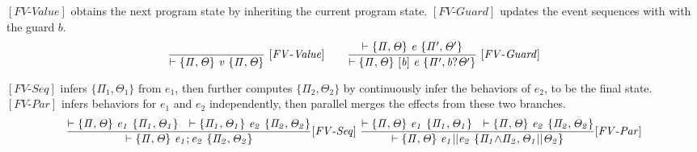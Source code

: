 \documentclass[acmsmall,10pt,review]{acmart}
\newcommand{\env}{\code{\mathcal{V}}}
\newcommand{\code}[1]{{\tt{\ensuremath{\m{#1}}}}}
\newcommand{\m}{\mathit}
\def\defeq{\ensuremath{\,\triangleq}}
\begin{document}
{

$[FV\text{-}\m{Value}]$  obtains the next program state by 
inheriting the current program state.
$[FV\text{-}Guard]$ updates the event sequences with with
the guard \code{b}. 
{{\small\begin{gather*}
  \code{\frac{
  }
{  \vdash \{  \Pi, \Theta \}\  v \ 
\{ \Pi, \Theta \}} \  
 {[FV\text{-}Value]}} 
 \qquad
 \code{\frac{
  \vdash \{  \Pi, \Theta \}\  e \ 
  \{ \Pi^\prime, \Theta^\prime \}
  }
{  \vdash \{  \Pi, \Theta \}\  [b]\ e \ 
\{  \Pi^\prime, b? \Theta^\prime \}} \  
 {[FV\text{-}Guard]}} 
\end{gather*}}}

$[FV\text{-}Seq]$ infers  \code{ \{  \Pi_1, \Theta_1\} } 
from \code{e_1}, 
then further computes  \code{ \{  \Pi_2, \Theta_2 \} } by 
continuously infer the behaviors of \code{e_2}, to be the final state.
$[FV\text{-}Par]$ infers behaviors for  \code{e_1} and \code{e_2} independently,
then parallel merges the effects from these two branches.  
{{\small\begin{gather*}
  \code{\frac{ 
 \vdash \{ \Pi, \Theta\} \ e_1 \ \{  \Pi_1, \Theta_1\} 
\ \  
\vdash \{ \Pi_1, \Theta_1\} \ e_2 \  \{  \Pi_2, \Theta_2 \} 
}{
  \vdash \{  \Pi, \Theta \}\  
  e_1;e_2 \ \{ \Pi_2, \Theta_2
  \}} 
   {[FV\text{-}Seq]}}  
\  
  \code{\frac{
 \vdash \{ \Pi, \Theta \} \ e_1 \  \{  \Pi_1, \Theta_1\} 
\ \  
\vdash \{  \Pi, \Theta \} \ e_2 \  \{  \Pi_2, \Theta_2 \} 
    }{
\vdash \{   \Pi, \Theta \}\  e_1 || e_2 \ \{ 
\Pi_1 {\wedge}\Pi_2 , \Theta_1 || \Theta_2
\}}  
{[FV\text{-}Par]}} 
\end{gather*}}}


}
\end{document}
